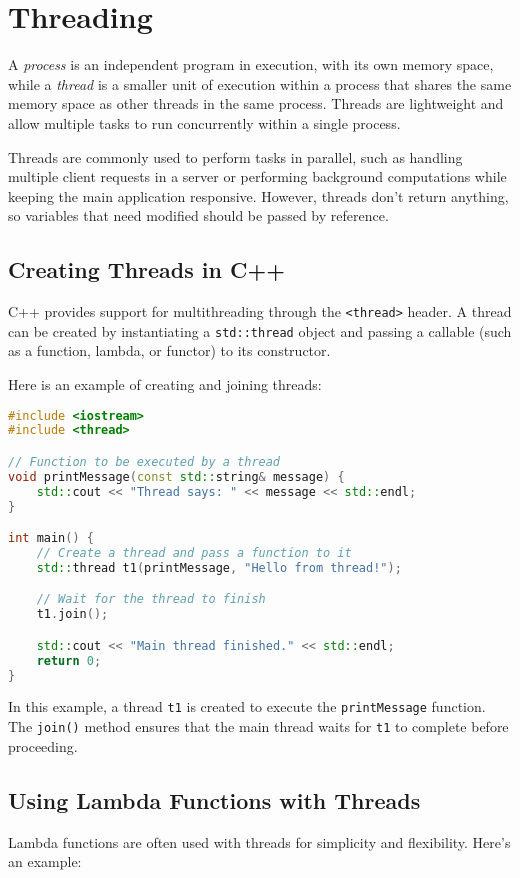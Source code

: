 \section{Threading}

A \emph{process} is an independent program in execution, with its own 
memory space, while a \emph{thread} is a smaller unit of execution 
within a process that shares the same memory space as other threads 
in the same process. Threads are lightweight and allow multiple tasks 
to run concurrently within a single process.

Threads are commonly used to perform tasks in parallel, such as handling 
multiple client requests in a server or performing background computations 
while keeping the main application responsive. However, threads don't 
return anything, so variables that need modified should be passed by reference. 

\subsection{Creating Threads in C++}
C++ provides support for multithreading through the \texttt{<thread>} header. 
A thread can be created by instantiating a \texttt{std::thread} object 
and passing a callable (such as a function, lambda, or functor) to its 
constructor.

Here is an example of creating and joining threads:

\begin{lstlisting}[language=C++]
#include <iostream>
#include <thread>

// Function to be executed by a thread
void printMessage(const std::string& message) {
    std::cout << "Thread says: " << message << std::endl;
}

int main() {
    // Create a thread and pass a function to it
    std::thread t1(printMessage, "Hello from thread!");

    // Wait for the thread to finish
    t1.join();

    std::cout << "Main thread finished." << std::endl;
    return 0;
}
\end{lstlisting}

In this example, a thread \texttt{t1} is created to execute the \texttt{printMessage} function.
The \texttt{join()} method ensures that the main thread waits for \texttt{t1} to complete before proceeding.

\subsection{Using Lambda Functions with Threads}
Lambda functions are often used with threads for simplicity and 
flexibility. Here's an example:


